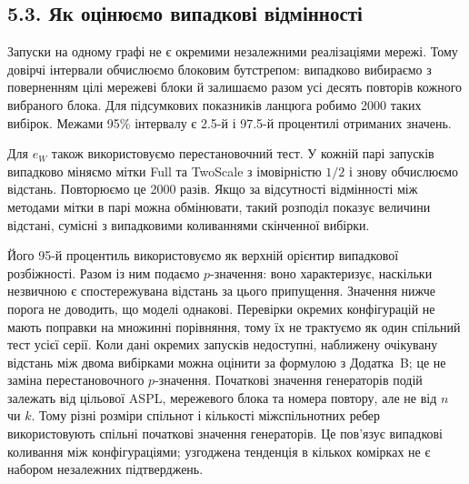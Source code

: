 \documentclass[11pt,a4paper]{article}
\newcommand{\Full}{\textnormal{Full}}
\newcommand{\TS}{\textnormal{TwoScale}}
\newcommand{\eW}{e_W}
\begin{document}
\subsection*{5.3. Як оцінюємо випадкові відмінності}
Запуски на одному графі не є окремими незалежними реалізаціями мережі. Тому довірчі інтервали обчислюємо блоковим бутстрепом: випадково вибираємо з поверненням цілі мережеві блоки й залишаємо разом усі десять повторів кожного вибраного блока. Для підсумкових показників ланцюга робимо 2000 таких вибірок. Межами 95\% інтервалу є 2.5-й і 97.5-й процентилі отриманих значень.
\par Для $\eW$ також використовуємо перестановочний тест. У кожній парі запусків випадково міняємо мітки \Full{} та \TS{} з імовірністю $1/2$ і знову обчислюємо відстань. Повторюємо це 2000 разів. Якщо за відсутності відмінності між методами мітки в парі можна обмінювати, такий розподіл показує величини відстані, сумісні з випадковими коливаннями скінченної вибірки.
\par Його 95-й процентиль використовуємо як верхній орієнтир випадкової розбіжності. Разом із ним подаємо $p$-значення: воно характеризує, наскільки незвичною є спостережувана відстань за цього припущення. Значення нижче порога не доводить, що моделі однакові. Перевірки окремих конфігурацій не мають поправки на множинні порівняння, тому їх не трактуємо як один спільний тест усієї серії. Коли дані окремих запусків недоступні, наближену очікувану відстань між двома вибірками можна оцінити за формулою з Додатка~B; це не заміна перестановочного $p$-значення.
Початкові значення генераторів подій залежать від цільової ASPL, мережевого блока та номера повтору, але не від $n$ чи $k$. Тому різні розміри спільнот і кількості міжспільнотних ребер використовують спільні початкові значення генераторів. Це пов'язує випадкові коливання між конфігураціями; узгоджена тенденція в кількох комірках не є набором незалежних підтверджень.
\end{document}
